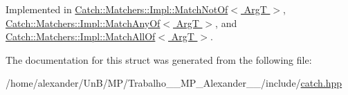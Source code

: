 Implemented in \hyperlink{structCatch_1_1Matchers_1_1Impl_1_1MatchNotOf_a1b9ad6566e4ab0f292d2903f557307cc}{Catch\-::\-Matchers\-::\-Impl\-::\-Match\-Not\-Of$<$ Arg\-T $>$}, \hyperlink{structCatch_1_1Matchers_1_1Impl_1_1MatchAnyOf_a73be317ecf5919af855af96d68e714b9}{Catch\-::\-Matchers\-::\-Impl\-::\-Match\-Any\-Of$<$ Arg\-T $>$}, and \hyperlink{structCatch_1_1Matchers_1_1Impl_1_1MatchAllOf_a7bf0c2d8cedf67ecf9d0a527cb5a8263}{Catch\-::\-Matchers\-::\-Impl\-::\-Match\-All\-Of$<$ Arg\-T $>$}.



The documentation for this struct was generated from the following file\-:\begin{DoxyCompactItemize}
\item 
/home/alexander/\-Un\-B/\-M\-P/\-Trabalho\-\_\-\_\-\-M\-P\-\_\-\-Alexander\-\_\-\_/include/\hyperlink{catch_8hpp}{catch.\-hpp}\end{DoxyCompactItemize}
